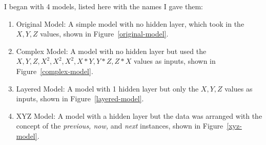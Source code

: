 \documentclass[]{report}
\begin{document}
I began with 4 models, listed here with the names I gave them:
\begin{enumerate}
	\item Original Model: A simple model with no hidden layer, which took in the $X,Y,Z$ values, shown in Figure~\ref{original-model}.
	\item Complex Model: A model with no hidden layer but used the $X,Y,Z,X^{2},X^{2},X^{2},X*Y,Y*Z,Z*X$ values as inputs, shown in Figure~\ref{complex-model}.
	\item Layered Model: A model with 1 hidden layer but only the $X,Y,Z$ values as inputs, shown in Figure~\ref{layered-model}.
	\item XYZ Model: A model with a hidden layer but the data was arranged with the concept of the \textit{previous, now,} and \textit{next} instances, shown in Figure~\ref{xyz-model}.
\end{enumerate}
\end{document}
